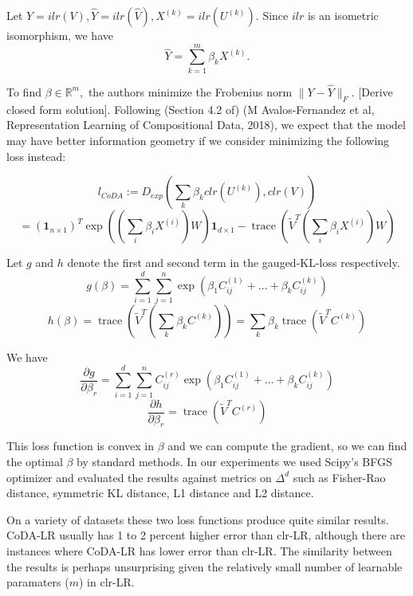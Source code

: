 \documentclass[BSc]{usydthesis}
\numberwithin{equation}{chapter}
\theoremstyle{remark}
\begin{document}
Let $Y = ilr(V), \hat{Y} = ilr(\hat{V}), X^{(k)} = ilr( U^{(k)} ).$  Since $ilr$ is an isometric isomorphism, we have $$ \hat{Y} = \sum_{k=1}^m \beta_k X^{(k)}.$$

To find $\beta \in \mathbb{R}^m,$ the authors minimize the Frobenius norm $ \| Y - \hat{Y} \|_F.$ [Derive closed form solution]. Following (Section 4.2 of) (M Avalos-Fernandez et al,  Representation Learning of Compositional Data, 2018), we expect that the model may have better information geometry if we consider minimizing the following loss instead:

$$ l_{CoDA} := D_{exp} \left( \sum_k \beta_k clr(U^{(k)} ), clr(V) \right)$$
$$ = (\mathbf{1}_{n \times 1})^T \exp \left( (\sum_i \beta_i X^{(i)})W \right) \mathbf{1}_{d\times 1} - \operatorname{trace}(\tilde{V}^T (\sum_i \beta_i X^{(i)})W )$$

Let $g$ and $h$ denote the first and second term in the gauged-KL-loss respectively. 
$$ g(\beta) = \sum_{i=1}^d \sum_{j=1}^n \exp \left( \beta_1 C^{(1)}_{ij} + \ldots + \beta_k C^{(k)}_{ij} \right)$$
$$ h(\beta) = \operatorname{trace}\left( \tilde{V}^T \left( \sum_k \beta_k C^{(k)} \right)  \right) = \sum_k \beta_k \operatorname{trace}\left( \tilde{V}^T C^{(k)} \right) $$

We have $$ \frac{ \partial g}{\partial \beta_r } = \sum_{i=1}^d \sum_{j=1}^n C^{(r)}_{ij} \exp \left( \beta_1 C^{(1)}_{ij} + \ldots + \beta_k C^{(k)}_{ij} \right)$$
$$ \frac{ \partial h}{\partial \beta_r } = \operatorname{trace}\left( \tilde{V}^T C^{(r)}\right)$$

This loss function is convex in $\beta$ and we can compute the gradient, so we can find the optimal $\beta$ by standard methods. In our experiments we used Scipy's BFGS optimizer and evaluated the results against metrics on $\Delta^d$ such as Fisher-Rao distance, symmetric KL distance, L1 distance and L2 distance.

On a variety of datasets these two loss functions produce quite similar results. CoDA-LR usually has 1 to 2 percent higher error than clr-LR, although there are instances where CoDA-LR has lower error than clr-LR. The similarity between the results is perhaps unsurprising given the relatively small number of learnable paramaters ($m$) in clr-LR. 
\end{document}
